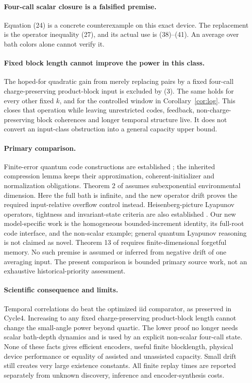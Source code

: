 \documentclass[11pt]{article}
\begin{document}
\paragraph{Four-call scalar closure is a falsified premise.}
Equation (24) is a concrete counterexample on this exact device.
The replacement is the operator inequality (27), and its actual use is
(38)--(41). An average over bath colors alone cannot verify it.

\paragraph{Fixed block length cannot improve the power in this class.}
The hoped-for quadratic gain from merely replacing pairs by a fixed
four-call charge-preserving product-block input is excluded by (3).
The same holds for every other fixed $k$, and for the controlled window
in Corollary~\ref{cor:log}. This closes that operation while leaving
unrestricted codes, feedback, non-charge-preserving block coherences and
longer temporal structure live. It does not convert an input-class
obstruction into a general capacity upper bound.

\paragraph{Primary comparison.}
Finite-error quantum code constructions are established
\cite{KLV,GBM,Tverberg}; the inherited compression lemma keeps their
approximation, coherent-initializer and normalization obligations.
Theorem 2 of \cite{GBM} assumes subexponential environmental dimension.
Here the full bath is infinite, and the new operator drift proves
the required input-relative overflow control instead.
Heisenberg-picture Lyapunov operators, tightness and invariant-state
criteria are also established \cite{Pan}. Our new model-specific work is
the homogeneous bounded-increment identity, its full-root code interface,
and the non-scalar example; general quantum Lyapunov reasoning is not
claimed as novel. Theorem 13 of \cite{KW} requires finite-dimensional
forgetful memory. No such premise is assumed or inferred from negative
drift of one averaging input. The present comparison is bounded primary
source work, not an exhaustive historical-priority assessment.

\paragraph{Scientific consequence and limits.}
Temporal correlations do beat the optimized iid comparator, as preserved
in Cycle4. Increasing to any fixed charge-preserving product-block length
cannot change the small-angle power beyond quartic. The lower proof no
longer needs scalar bath-depth dynamics and is used by an explicit
non-scalar four-call state. None of these facts gives efficient encoders,
useful finite blocklength, physical device performance or equality of
assisted and unassisted capacity. Small drift still creates very large
existence constants. All finite replay times are reported separately from
unknown discovery, inference and encoder-synthesis costs.
\end{document}

